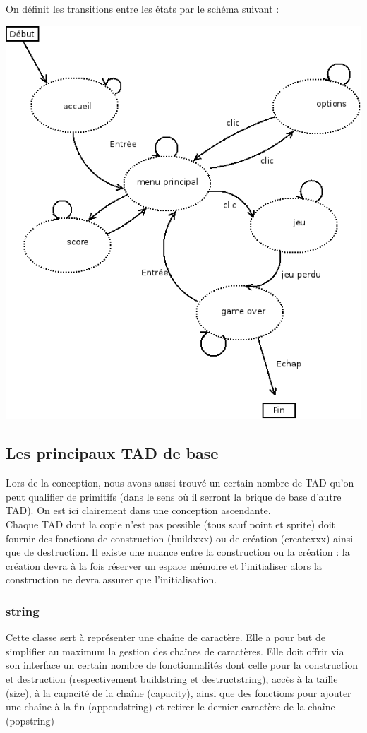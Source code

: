 On définit les transitions entre les états par le schéma suivant :
\begin{center}
\includegraphics[scale=0.6]{img/transition.png}
\end{center}

\subsection{Les principaux TAD de base}
Lors de la conception, nous avons aussi trouvé un certain nombre de TAD qu'on peut qualifier de primitifs (dans le sens où il serront la brique de base d'autre TAD). On est ici clairement dans une conception ascendante.
~\\

Chaque TAD dont la copie n'est pas possible (tous sauf point et
sprite) doit fournir des fonctions de construction (build\textunderscore  xxx) ou
de création (create\textunderscore xxx) ainsi que de destruction.
Il existe une nuance entre la construction ou la création : la
création devra à la fois réserver un espace mémoire et l'initialiser
alors la construction ne devra assurer que l'initialisation.

\subsubsection{string}
Cette classe sert à représenter une chaîne de caractère. Elle a pour
but de simplifier au maximum la gestion des chaînes de
caractères. Elle doit offrir via son interface un certain nombre de
fonctionnalités dont celle pour la construction et destruction
(respectivement build\textunderscore  string et destruct\textunderscore string), accès à la taille
(size), à la capacité de la chaîne (capacity), ainsi que des fonctions
pour ajouter une chaîne à la fin (append\textunderscore string) et
retirer le dernier caractère de la chaîne (pop\textunderscore  string)

